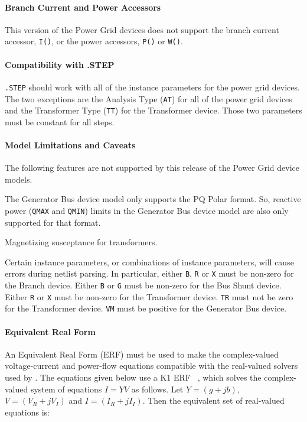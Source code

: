 \paragraph{Branch Current and Power Accessors}
This version of the Power Grid devices does not support the branch current accessor, \texttt{I()}, 
or the power accessors, \texttt{P()} or \texttt{W()}.

\paragraph{Compatibility with .STEP}
\texttt{.STEP} should work with all of the instance parameters for the power grid devices. 
The two exceptions are the Analysis Type (\texttt{AT}) for all of the power grid devices 
and the Transformer Type (\texttt{TT}) for the Transformer device.  Those two parameters
must be constant for all steps. 

\paragraph{Model Limitations and Caveats}
The following features are not supported by this release of the Power Grid device models.
\begin{XyceItemize}
  \item The Generator Bus device model only supports the PQ Polar format. So, reactive 
     power (\texttt{QMAX} and \texttt{QMIN}) limits in the Generator Bus device model are
     also only supported for that format.
  \item Magnetizing susceptance for transformers.
  \item Certain instance parameters, or combinations of instance parameters, will cause
     errors during netlist parsing.  In particular, either \texttt{B}, \texttt{R} or 
     \texttt{X} must be non-zero for the Branch device.  Either \texttt{B} or
     \texttt{G} must be non-zero for the Bus Shunt device.  Either \texttt{R} or
     \texttt{X} must be non-zero for the Transformer device.  \texttt{TR} must not
     be zero for the Transformer device.  \texttt{VM} must be positive for the 
     Generator Bus device. 
\end{XyceItemize}

\paragraph{Equivalent Real Form}
An Equivalent Real Form (ERF) must be used to make the complex-valued voltage-current 
and power-flow equations compatible with the real-valued solvers used by \Xyce{}.  The 
equations given below use a K1 ERF ~\cite{Munankarmy}, which 
solves the complex-valued system of equations $I=YV$ as follows.  Let $Y=(g+jb)$, 
$V=(V_{R}+jV_{I})$ and $I=(I_{R}+jI_{I})$.  Then the equivalent set of real-valued equations is:

